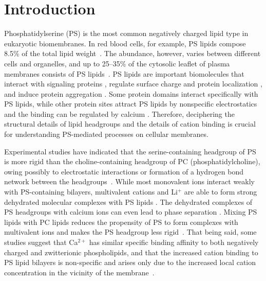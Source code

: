 \documentclass[journal=jpcbfk,manuscript=article]{achemso}
\begin{document}

\maketitle %

\section{Introduction}
Phosphatidylserine (PS) is the most common negatively
charged lipid type in eukaryotic biomembranes. In red blood cells, for example,
PS lipids compose 8.5\% of the total lipid weight~\cite{lemmon08}. 
The abundance, however, varies between different cells and organelles, and up to
25--35\% of the cytosolic leaflet of plasma membranes consists of PS lipids~\cite{leventis10,li14}.
PS lipids are important biomolecules that interact with
signaling proteins \cite{leventis10}, regulate
surface charge and protein localization \cite{yeung08}, and
induce protein aggregation \cite{zhao04,gorbenko06}.
Some protein domains interact specifically with PS lipids,
while other protein sites attract PS lipids by nonspecific electrostatics and the
binding can be regulated by calcium \cite{leventis10}.
Therefore, deciphering the structural details
of lipid headgroups and the details of cation binding
is crucial for understanding PS-mediated processes on cellular membranes.

Experimental studies have indicated that the
serine-containing headgroup of PS is more rigid than the choline-containing headgroup of PC (phosphatidylcholine),
owing possibly to electrostatic interactions or formation of a hydrogen bond network between the headgroups~\cite{browning80,buldt81}.
While most monovalent ions interact weakly with
PS-containing bilayers, multivalent cations and Li$^+$ are able to form strong
dehydrated molecular complexes with PS lipids \cite{hauser77,kurland79,eisenberg79,hauser83,dluhy83,hauser85,feigenson86,mattai89,roux90,roux91,boettcher11}.
The dehydrated complexes of PS headgroups with calcium ions can even lead to
phase separation \cite{hauser77,kurland79,hauser85,feigenson86,mattai89,roux90,roux91}. Mixing PS lipids with PC lipids reduces the propensity of PS to form complexes with multivalent ions and makes the PS headgroup less rigid~\cite{browning80,buldt81,roux90,roux91}.
That being said, some studies suggest that Ca$^{2+}$ has similar specific binding affinity 
to both negatively charged and zwitterionic phospholipids, and that
the increased cation binding to PS lipid bilayers is non-specific and arises only due to the increased local cation concentration in the vicinity of the membrane~\cite{seelig90,sinn06}. 
\end{document}
